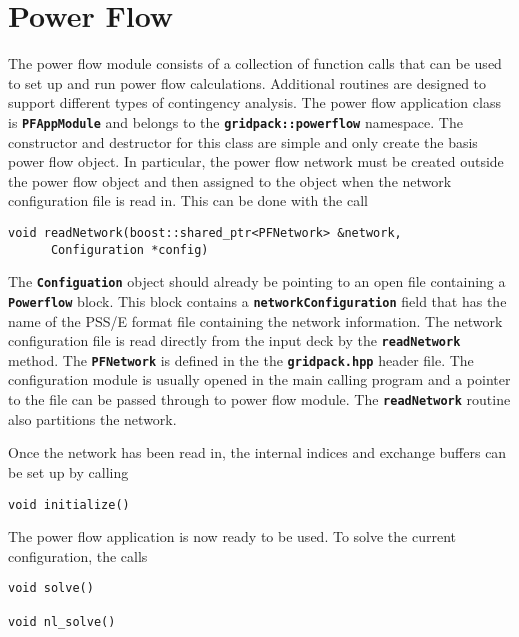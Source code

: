 \section{Power Flow}

The power flow module consists of a collection of function calls that can be used to set up and run power flow calculations. Additional routines are designed to support different types of contingency analysis. The power flow application class is \texttt{\textbf{PFAppModule}} and belongs to the \texttt{\textbf{gridpack::powerflow}} namespace. The constructor and destructor for this class are simple and only create the basis power flow object. In particular, the power flow network must be created outside the power flow object and then assigned to the object when the network configuration file is read in. This can be done with the call

{
\color{red}
\begin{Verbatim}[fontseries=b]
void readNetwork(boost::shared_ptr<PFNetwork> &network,
      Configuration *config)
\end{Verbatim}
}

The \texttt{\textbf{Configuation}} object should already be pointing to an open file containing a \texttt{\textbf{Powerflow}} block. This block contains a \texttt{\textbf{networkConfiguration}} field that has the name of the PSS/E format file containing the network information. The network configuration file is read directly from the input deck by the \texttt{\textbf{readNetwork }}method. The \texttt{\textbf{PFNetwork}} is defined in the the \texttt{\textbf{gridpack.hpp}} header file. The configuration module is usually opened in the main calling program and a pointer to the file can be passed through to power flow module. The \texttt{\textbf{readNetwork}} routine also partitions the network.

Once the network has been read in, the internal indices and exchange buffers can be set up by calling

{
\color{red}
\begin{Verbatim}[fontseries=b]
void initialize()
\end{Verbatim}
}

The power flow application is now ready to be used. To solve the current configuration, the calls

{
\color{red}
\begin{Verbatim}[fontseries=b]
void solve()

void nl_solve()
\end{Verbatim}
}

